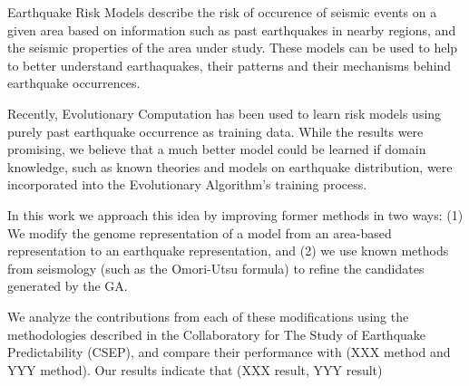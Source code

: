 Earthquake Risk Models describe the risk of occurence of seismic
events on a given area based on information such as past earthquakes
in nearby regions, and the seismic properties of the area under study. 
These models can be used to help to better understand earthaquakes,
their patterns and their mechanisms behind earthquake occurrences.



Recently, Evolutionary Computation has been used to learn risk models
using purely past earthquake occurrence as training data. While the
results were promising, we believe that a much better model could be
learned if domain knowledge, such as known theories and models on
earthquake distribution, were incorporated into the Evolutionary
Algorithm's training process.

In this work we approach this idea by improving former methods in two
ways: (1) We modify the genome representation of a model from an
area-based representation to an earthquake representation, and (2) we
use known methods from seismology (such as the Omori-Utsu formula) to 
refine the candidates generated by the GA.

We analyze the contributions from each of these modifications using
the methodologies described in the Collaboratory for The Study of
Earthquake Predictability (CSEP), and compare their performance with
(XXX method and YYY method). Our results indicate that (XXX result,
YYY result)
